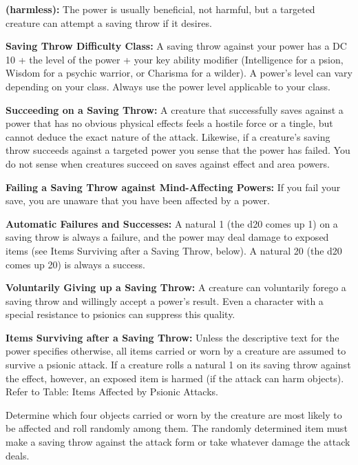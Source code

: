 \documentclass{article}
\begin{document}
\textbf{(harmless):} The power is usually beneficial, not harmful, but a targeted 
creature can attempt a saving throw if it desires.

\textbf{Saving Throw Difficulty Class:} A saving throw against your power has a 
DC 10 + the level of the power + your key ability modifier (Intelligence for a 
psion, Wisdom for a psychic warrior, or Charisma for a wilder). A power's level 
can vary depending on your class. Always use the power level applicable to your 
class.

\textbf{Succeeding on a Saving Throw:} A creature that successfully saves against 
a power that has no obvious physical effects feels a hostile force or a tingle, 
but cannot deduce the exact nature of the attack. Likewise, if a creature's saving 
throw succeeds against a targeted power you sense that the power has failed. You 
do not sense when creatures succeed on saves against effect and area powers.

\textbf{Failing a Saving Throw against Mind-Affecting Powers: }If you fail your 
save, you are unaware that you have been affected by a power.

\textbf{Automatic Failures and Successes:} A natural 1 (the d20 comes up 1) on 
a saving throw is always a failure, and the power may deal damage to exposed items 
(see Items Surviving after a Saving Throw, below). A natural 20 (the d20 comes 
up 20) is always a success.

\textbf{Voluntarily Giving up a Saving Throw:} A creature can voluntarily forego 
a saving throw and willingly accept a power's result. Even a character with a special 
resistance to psionics can suppress this quality.

\textbf{Items Surviving after a Saving Throw:} Unless the descriptive text for 
the power specifies otherwise, all items carried or worn by a creature are assumed 
to survive a psionic attack. If a creature rolls a natural 1 on its saving throw 
against the effect, however, an exposed item is harmed (if the attack can harm 
objects). Refer to Table: Items Affected by Psionic Attacks.

Determine which four objects carried or worn by the creature are most likely to 
be affected and roll randomly among them. The randomly determined item must make 
a saving throw against the attack form or take whatever damage the attack deals.
\end{document}
